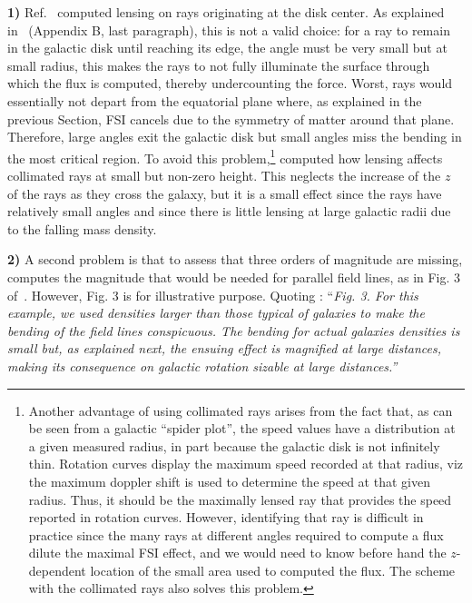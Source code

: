 \documentclass[superscriptaddress,amsmath,amssymb,nofootinbib]{revtex4}
\begin{document}
%
{\bf 1)} Ref.~\cite{Barker:2023xsx} computed lensing on rays originating at the disk center. As explained in~\cite{Deur:2020wlg} (Appendix B, last paragraph), this is not a valid choice:
for a ray to remain in the galactic disk until reaching its edge, the angle must be very small but at small radius, this makes the rays to not fully
illuminate the surface through which the flux is computed, thereby undercounting the force. Worst, rays would essentially not 
depart from the equatorial plane where, as explained in the previous Section, FSI cancels due to the 
symmetry of matter around that plane. 
Therefore, large angles exit the galactic disk but small angles miss the bending in the most critical region. 
To avoid this problem,\footnote{
Another advantage of using collimated rays arises from the fact that, as can be seen from a galactic ``spider plot'', 
the speed values have a distribution at a given measured radius, in part because the galactic disk is not infinitely thin. 
Rotation curves display the maximum speed recorded at that radius, 
viz the maximum doppler shift is used to determine the speed at that given radius. 
Thus, it should be the maximally lensed ray that provides the speed reported in rotation curves. However,  identifying that ray is 
difficult in practice since the many rays at different angles required to compute a flux dilute the maximal FSI effect, and we would need to know before hand 
the $z$-dependent location of the small area used to computed the flux. The scheme with the collimated rays also solves this problem. } \cite{Deur:2020wlg} computed how lensing affects collimated rays at small but non-zero height.
%
This neglects the increase of the $z$ of the rays as they cross the galaxy, but it is a small effect since the rays have relatively small angles and since there is little lensing at large galactic radii due to the falling mass density.
%

%
{\bf 2)} A second problem is that to assess that three orders of magnitude are missing, \cite{ Barker:2023xsx} computes the magnitude that would be needed 
for parallel field lines, as in Fig. 3 of~\cite{Deur:2020wlg}. However, Fig. 3 is for illustrative purpose. Quoting \cite{Deur:2020wlg}: ``{\it Fig. 3. For this example, we used densities larger than those typical of galaxies to make the bending of the field lines conspicuous. The bending for actual galaxies densities is small but, as explained next, the ensuing effect is magnified at large distances, making its consequence on galactic rotation sizable at large distances.''} %
\end{document}
